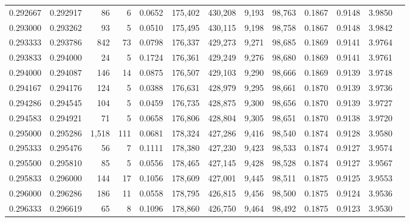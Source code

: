 \begin{tabular}{rrrrrrrrrrrrr}
0.292667 & 0.292917 &    86 &   6 &                                     0.0652 & 175,402 & 430,208 &   9,193 &  98,763 & 0.1867 & 0.9148 & 3.9850 \\
0.293000 & 0.293262 &    93 &   5 &                                     0.0510 & 175,495 & 430,115 &   9,198 &  98,758 & 0.1867 & 0.9148 & 3.9842 \\
0.293333 & 0.293786 &   842 &  73 &                                     0.0798 & 176,337 & 429,273 &   9,271 &  98,685 & 0.1869 & 0.9141 & 3.9764 \\
0.293833 & 0.294000 &    24 &   5 &                                     0.1724 & 176,361 & 429,249 &   9,276 &  98,680 & 0.1869 & 0.9141 & 3.9761 \\
0.294000 & 0.294087 &   146 &  14 &                                     0.0875 & 176,507 & 429,103 &   9,290 &  98,666 & 0.1869 & 0.9139 & 3.9748 \\
0.294167 & 0.294176 &   124 &   5 &                                     0.0388 & 176,631 & 428,979 &   9,295 &  98,661 & 0.1870 & 0.9139 & 3.9736 \\
0.294286 & 0.294545 &   104 &   5 &                                     0.0459 & 176,735 & 428,875 &   9,300 &  98,656 & 0.1870 & 0.9139 & 3.9727 \\
0.294583 & 0.294921 &    71 &   5 &                                     0.0658 & 176,806 & 428,804 &   9,305 &  98,651 & 0.1870 & 0.9138 & 3.9720 \\
0.295000 & 0.295286 & 1,518 & 111 &                                     0.0681 & 178,324 & 427,286 &   9,416 &  98,540 & 0.1874 & 0.9128 & 3.9580 \\
0.295333 & 0.295476 &    56 &   7 &                                     0.1111 & 178,380 & 427,230 &   9,423 &  98,533 & 0.1874 & 0.9127 & 3.9574 \\
0.295500 & 0.295810 &    85 &   5 &                                     0.0556 & 178,465 & 427,145 &   9,428 &  98,528 & 0.1874 & 0.9127 & 3.9567 \\
0.295833 & 0.296000 &   144 &  17 &                                     0.1056 & 178,609 & 427,001 &   9,445 &  98,511 & 0.1875 & 0.9125 & 3.9553 \\
0.296000 & 0.296286 &   186 &  11 &                                     0.0558 & 178,795 & 426,815 &   9,456 &  98,500 & 0.1875 & 0.9124 & 3.9536 \\
0.296333 & 0.296619 &    65 &   8 &                                     0.1096 & 178,860 & 426,750 &   9,464 &  98,492 & 0.1875 & 0.9123 & 3.9530 \\

\end{tabular}
